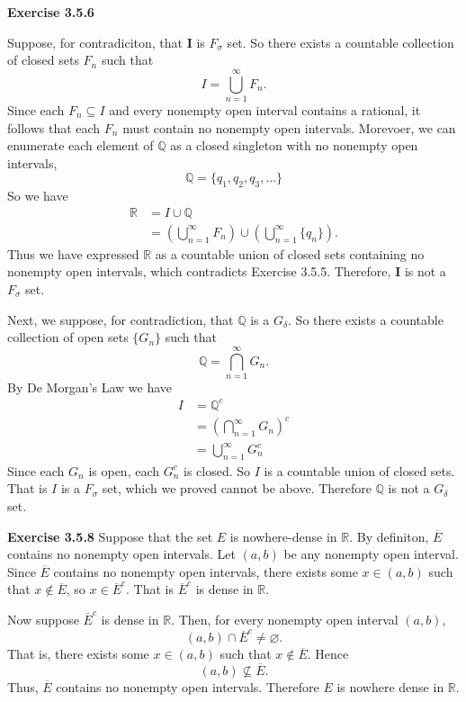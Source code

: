 \documentclass[12pt]{article}
\begin{document}
\textbf{Exercise 3.5.6}

Suppose, for contradiciton, that \( \mathbf{I} \) is \( F_{\sigma} \) set. So there exists a countable collection of closed sets \( F_n \) such that
\[
    I = \bigcup_{n=1}^{\infty} F_n.
\]
Since each \( F_n \subseteq I \) and every nonempty open interval contains a rational, it follows that each \( F_n \) must contain no nonempty open intervals. Morevoer, we can enumerate each element of \( \mathbb{Q} \) as a closed singleton with no nonempty open intervals,
\[
    \mathbb{Q} = \{q_1, q_2, q_3, \dots \}
\]
So we have
\[
    \begin{split}
        \mathbb{R} & = I \cup \mathbb{Q}                                                                           \\
                   & = \left(\bigcup_{n=1}^{\infty} F_{n}\right) \cup \left(\bigcup_{n=1}^{\infty} \{q_n\}\right).
    \end{split}
\]
Thus we have expressed \( \mathbb{R} \) as a countable union of closed sets containing no nonempty open intervals, which contradicts Exercise 3.5.5. Therefore, \( \mathbf{I} \) is not a \( F_\sigma  \) set.

Next, we suppose, for contradiction, that \( \mathbb{Q} \) is a \( G_\delta  \). So there exists a countable collection of open sets \( \{G_n\} \) such that
\[
    \mathbb{Q} = \bigcap_{n=1}^{\infty} G_n.
\]
By De Morgan's Law we have
\[
    \begin{split}
        I & = \mathbb{Q}^c                              \\
          & = \left(\bigcap_{n=1}^{\infty} G_n\right)^c \\
          & = \bigcup_{n=1}^{\infty} G_n^c
    \end{split}
\]
Since each \( G_n \) is open, each \( G_n^c \) is closed. So \( I \) is a countable union of closed sets. That is \( I \) is a \( F_\sigma  \) set, which we proved cannot be above. Therefore \( \mathbb{Q} \) is not a \( G_\delta  \) set.

\textbf{Exercise 3.5.8}
Suppose that the set \( E \) is nowhere-dense in \( \mathbb{R} \). By definiton, \( \overline{E} \) contains no nonempty open intervals. Let \( (a,b) \) be any nonempty open interval. Since \( \overline{E} \) contains no nonempty open intervals, there exists some \( x \in (a,b) \) such that
\( x \not \in \overline{E} \), so \( x \in \overline{E}^c \). That is \( \overline{E}^c \) is dense in \( \mathbb{R} \).

Now suppose \( \overline{E}^c \) is dense in \( \mathbb{R} \). Then, for every nonempty open interval \( (a,b) \),
\[
    (a,b) \cap  \overline{E}^c \neq \varnothing .
\]
That is, there exists some \( x \in (a,b) \) such that \( x \not \in \overline{E} \). Hence
\[
    (a,b) \not \subseteq \overline{E}.
\]
Thus, \( \overline{E} \) contains no nonempty open intervals. Therefore \( E \) is nowhere dense in \( \mathbb{R} \).
\end{document}
